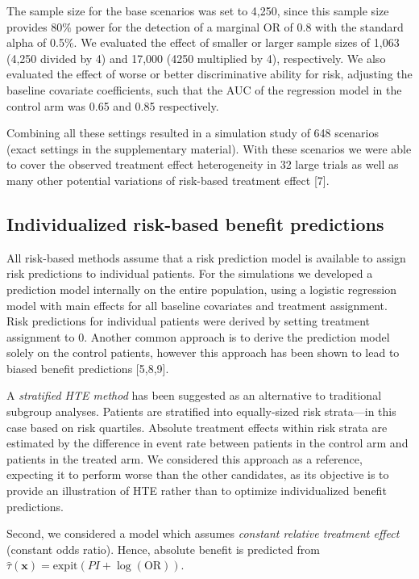 \documentclass[]{elsarticle} %
\begin{document}
The sample size for the base scenarios was set to 4,250, since this
sample size provides \(80\%\) power for the detection of a marginal OR
of 0.8 with the standard alpha of 0.5\%. We evaluated the effect of
smaller or larger sample sizes of 1,063 (4,250 divided by 4) and 17,000
(4250 multiplied by 4), respectively. We also evaluated the effect of
worse or better discriminative ability for risk, adjusting the baseline
covariate coefficients, such that the AUC of the regression model in the
control arm was 0.65 and 0.85 respectively.

Combining all these settings resulted in a simulation study of 648
scenarios (exact settings in the supplementary material). With these
scenarios we were able to cover the observed treatment effect
heterogeneity in 32 large trials as well as many other potential
variations of risk-based treatment effect {[}7{]}.

\hypertarget{individualized-risk-based-benefit-predictions}{%
\subsection{Individualized risk-based benefit
predictions}\label{individualized-risk-based-benefit-predictions}}

All risk-based methods assume that a risk prediction model is available
to assign risk predictions to individual patients. For the simulations
we developed a prediction model internally on the entire population,
using a logistic regression model with main effects for all baseline
covariates and treatment assignment. Risk predictions for individual
patients were derived by setting treatment assignment to 0. Another
common approach is to derive the prediction model solely on the control
patients, however this approach has been shown to lead to biased benefit
predictions {[}5,8,9{]}.

A \emph{stratified HTE method} has been suggested as an alternative to
traditional subgroup analyses. Patients are stratified into
equally-sized risk strata---in this case based on risk quartiles.
Absolute treatment effects within risk strata are estimated by the
difference in event rate between patients in the control arm and
patients in the treated arm. We considered this approach as a reference,
expecting it to perform worse than the other candidates, as its
objective is to provide an illustration of HTE rather than to optimize
individualized benefit predictions.

Second, we considered a model which assumes \emph{constant relative
treatment effect} (constant odds ratio). Hence, absolute benefit is
predicted from
\(\hat{\tau}(\bm{x}) = \text{expit}(PI +\log(\text{OR}))\).
\end{document}
